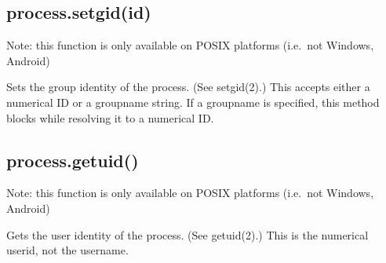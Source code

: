\subsection{process.setgid(id)}\label{process.setgidid}

Note: this function is only available on POSIX platforms (i.e.~not
Windows, Android)

Sets the group identity of the process. (See setgid(2).) This accepts
either a numerical ID or a groupname string. If a groupname is
specified, this method blocks while resolving it to a numerical ID.

\begin{Shaded}
\begin{Highlighting}[]
 \NormalTok{(} \NormalTok{&& }\NormalTok{) \{}
  \NormalTok{(} \NormalTok{+ }\NormalTok{());}
   \NormalTok{\{}
    \NormalTok{(}\NormalTok{);}
    \NormalTok{(} \NormalTok{+ }\NormalTok{());}
  \NormalTok{\}}
   
    \NormalTok{(} 
  \NormalTok{\}}
\NormalTok{\}}
\end{Highlighting}
\end{Shaded}

\subsection{process.getuid()}\label{process.getuid}

Note: this function is only available on POSIX platforms (i.e.~not
Windows, Android)

Gets the user identity of the process. (See getuid(2).) This is the
numerical userid, not the username.

\begin{Shaded}
\begin{Highlighting}[]
 \NormalTok{(}\NormalTok{) \{}
  \NormalTok{(} \NormalTok{+ }\NormalTok{());}
\NormalTok{\}}
\end{Highlighting}
\end{Shaded}

